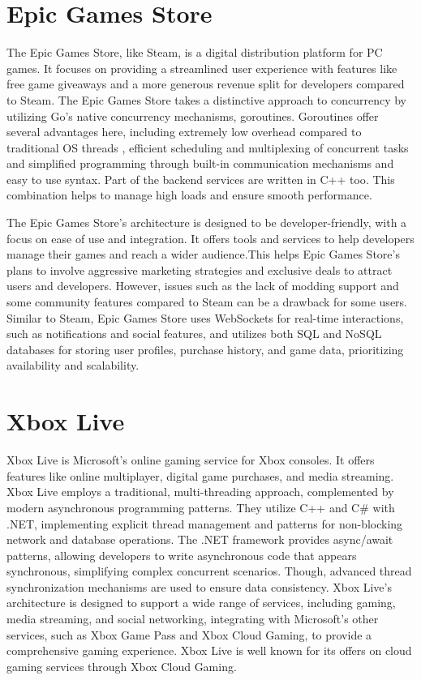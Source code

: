 \documentclass[]{project_interim}
\begin{document}
\section{Epic Games Store}
The Epic Games Store, like Steam, is a digital distribution platform for
PC games. It focuses on providing a streamlined user experience with features
like free game giveaways and a more generous revenue split for developers
compared to Steam. The Epic Games Store takes a distinctive approach to concurrency by utilizing
Go's native concurrency mechanisms, goroutines\cite{epic_games_jobs}. Goroutines offer several
advantages here, including extremely low overhead compared to traditional OS threads
, efficient scheduling and multiplexing of concurrent tasks and simplified
programming through built-in communication mechanisms and easy to use syntax.
Part of the backend services are written in C++ too\cite{epic_games_jobs}. This combination
helps to manage high loads and ensure smooth performance.

The Epic Games Store's architecture is designed to be developer-friendly, with a
focus on ease of use and integration. It offers tools and services to help
developers manage their games and reach a wider audience.This helps Epic Games
Store's plans to involve aggressive marketing strategies and exclusive
deals to attract users and developers. However, issues such as the lack of modding support and
some community features compared to Steam can be a drawback for some users.
\cite{epic_games_dev_update} Similar to Steam, Epic Games Store uses WebSockets for real-time interactions,
such as notifications and social features, and utilizes both SQL and NoSQL
databases for storing user profiles, purchase history, and game data,
prioritizing availability and scalability.\cite{spring_epic_2016, epic_games_jobs}

\section{Xbox Live}
Xbox Live is Microsoft's online gaming service for Xbox consoles. It offers
features like online multiplayer, digital game purchases, and media streaming.
Xbox Live employs a traditional, multi-threading approach, complemented by modern
asynchronous programming patterns. They utilize C++ and C\# with .NET\cite{kevinasgari_microsoft.xbox.services_nodate}, implementing
explicit thread management and patterns for non-blocking network and database operations.
The .NET framework provides async/await patterns, allowing developers to write
asynchronous code that appears synchronous, simplifying complex concurrent scenarios.
Though, advanced thread synchronization mechanisms are used to ensure data consistency.
\cite{m-stahl_sdk_2023, woolsey_how_2024} Xbox Live's architecture is designed to support a wide range of services, including gaming,
media streaming, and social networking, integrating with Microsoft's other services, such as Xbox Game
Pass and Xbox Cloud Gaming, to provide a comprehensive gaming experience. Xbox Live is well known
for its offers on cloud gaming services through Xbox Cloud Gaming.
\end{document}
